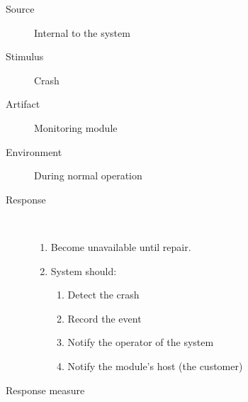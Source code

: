 \begin{description}
	\item[Source] Internal to the system
	\item[Stimulus] Crash
	\item[Artifact] Monitoring module 
	\item[Environment] During normal operation 
	\item[Response] \
	\begin{enumerate}
	  \item Become unavailable until repair.  
	  \item System should:
	  \begin{enumerate}
	  	\item Detect the crash
	  	\item Record the event
	  	\item Notify the operator of the system
	  	\item Notify the module's host (the customer)
	  \end{enumerate}
	\end{enumerate}
	\item[Response measure] \ %
\end{description}